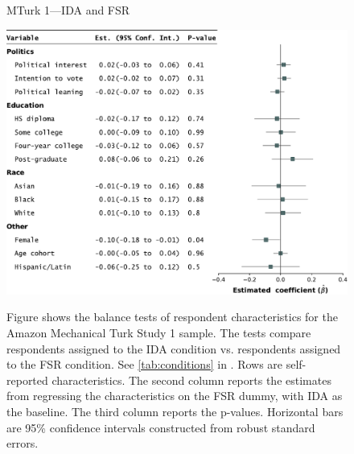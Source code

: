\begin{center}
	\begin{figure}
		\centering
		\caption{MTurk 1---IDA and FSR}
		\includegraphics[width=\textwidth]{../figs/study1-baltest-FSR-ips.pdf}
		\label{fig:baltest-FSR-ips}
		\caption*{\footnotesize 
			Figure shows the balance tests of respondent characteristics for the Amazon Mechanical Turk Study 1 sample.
			The tests compare respondents assigned to the IDA condition vs. respondents assigned to the FSR condition.
			See \cref{tab:conditions} in .
			Rows are self-reported characteristics.
			The second column reports the estimates from regressing the characteristics on the FSR dummy, with IDA as the baseline.
			The third column reports the p-values.
			Horizontal bars are 95\% confidence intervals constructed from robust standard errors.
		}
	\end{figure}
\end{center}

